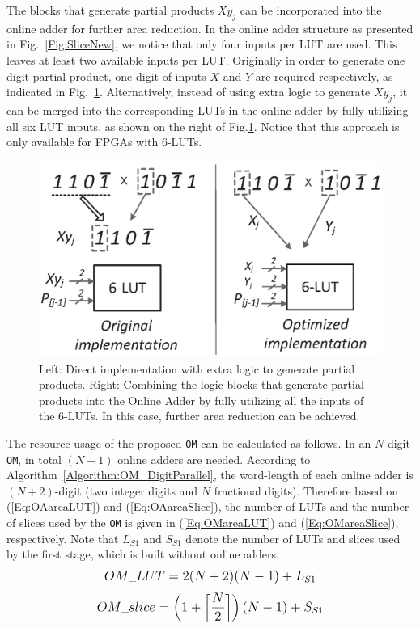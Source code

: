 \documentclass[conference]{IEEEtran}
\begin{document}
The blocks that generate partial products $Xy_j$ can be incorporated into the online adder for further area reduction. In the online adder structure as presented in Fig.~\ref{Fig:SliceNew}, we notice that only four inputs per LUT are used. This leaves at least two available inputs per LUT. Originally in order to generate one digit partial product, one digit of inputs $X$ and $Y$ are required respectively, as indicated in Fig.~\ref{Fig:PartialProduct}. Alternatively, instead of using extra logic to generate $Xy_j$, it can be merged into the corresponding LUTs in the online adder by fully utilizing all six LUT inputs, as shown on the right of Fig.\ref{Fig:PartialProduct}. Notice that this approach is only available for FPGAs with 6-LUTs.\vspace{-0.5ex}
%
\begin{figure}[tbp]
	\centering
	\includegraphics[width=.4\textwidth]{./Figures/PartialProduct.eps}
	\vspace{-1.5ex}
	\caption{Left: Direct implementation with extra logic to generate partial products. Right: Combining the logic blocks that generate partial products into the Online Adder by fully utilizing all the inputs of the 6-LUTs. In this case, further area reduction can be achieved.}
	\label{Fig:PartialProduct}
	\vspace{-2ex}
\end{figure}

The resource usage of the proposed \texttt{OM} can be calculated as follows. In an $N$-digit \texttt{OM}, in total $(N-1)$ online adders are needed. According to Algorithm~\ref{Algorithm:OM_DigitParallel}, the word-length of each online adder is $(N+2)$-digit (two integer digits and $N$ fractional digits). Therefore based on (\ref{Eq:OAareaLUT}) and (\ref{Eq:OAareaSlice}), the number of LUTs and the number of slices used by the \texttt{OM} is given in (\ref{Eq:OMareaLUT}) and (\ref{Eq:OMareaSlice}), respectively. Note that $L_{S1}$ and $S_{S1}$ denote the number of LUTs and slices used by the first stage, which is built without online adders.\vspace{-0.5ex}
%
\begin{eqnarray}\label{Eq:OMareaLUT}
\scriptsize
	OM\_{LUT} = 2(N+2)(N-1) + {L}_{S1}
\normalsize
\end{eqnarray}
%
\begin{eqnarray}\label{Eq:OMareaSlice}
\scriptsize
	OM\_{slice} = \left(1+\left\lceil{\frac{N}{2}}\right\rceil\right)(N-1)+S_{S1}
\normalsize
\end{eqnarray}
\end{document}
